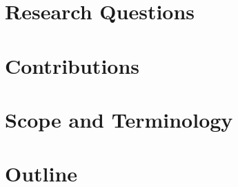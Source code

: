 \documentclass[headsepline,footsepline,footinclude=false,oneside,fontsize=11pt,paper=a4,listof=totoc,bibliography=totoc]{scrbook}
\begin{document}
\section{Research Questions}\label{sec:intro:questions}

\section{Contributions}\label{sec:intro:contributions}

\section{Scope and Terminology}\label{sec:intro:scope}

\section{Outline}\label{sec:intro:outline}

\end{document}
